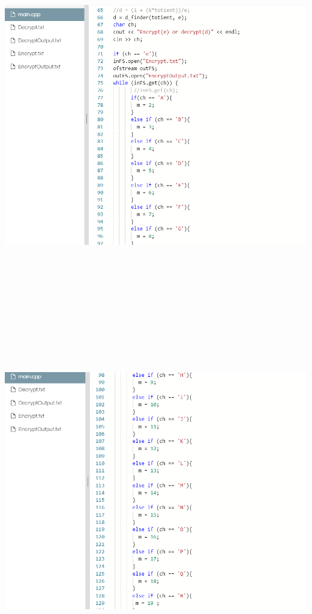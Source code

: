 \documentclass{article}
\begin{document}
\begin{solution}
\includegraphics[width=16cm, height=16cm]{3a.png}\\
\includegraphics[width=16cm, height=16cm]{4a.png}\\

\end{solution}
\end{document}

